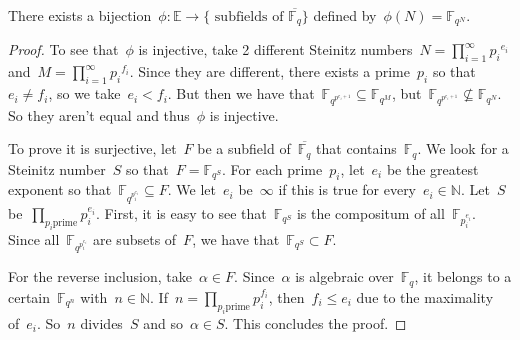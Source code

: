 \begin{theorem}
  There exists a bijection~$\phi\colon \mathbb{E} \rightarrow \{\text{ subfields of } \overline{\mathbb{F}_q} \}$ defined by~$\phi(N) = \mathbb{F}_{q^N}$.
  \begin{proof}
    To see that~$\phi$ is injective, take 2 different Steinitz numbers~$N=\prod_{i=1}^\infty {p_i}^{e_{i}}$ and~$M=\prod_{i=1}^\infty {p_i}^{f_{i}}$. Since they are different, there exists a prime~$p_i$ so that~$e_i \neq f_i$, so we take~$e_i < f_i$. But then we have that~$\mathbb{F}_{q^{p^{e_i+1}}} \subseteq \mathbb{F}_{q^M}$, but~$\mathbb{F}_{q^{p^{e_i+1}}} \nsubseteq \mathbb{F}_{q^N}$. So they aren't equal and thus~$\phi$ is injective.

    To prove it is surjective, let~$F$ be a subfield of~$\overline{\mathbb{F}_{q}}$ that contains~$\mathbb{F}_q$. We look for a Steinitz number~$S$ so that~$F = \mathbb{F}_{q^S}$. For each prime~$p_i$, let~$e_i$ be the greatest exponent so that~$\mathbb{F}_{q^{p_i^{e_i}}} \subseteq F$. We let~$e_i$ be~$\infty$ if this is true for every~$e_i \in \mathbb{N}$. Let~$S$ be~$\prod_{p_i \text{prime}} p_i^{e_i}$. First, it is easy to see that~$\mathbb{F}_{q^S}$ is the compositum of all~$\mathbb{F}_{p_i^{e_i}}$. Since all~$\mathbb{F}_{q^{p_i^{e_i}}}$ are subsets of~$F$, we have that~$\mathbb{F}_{q^S} \subset F$.
    
    For the reverse inclusion, take~$\alpha \in F$. Since~$\alpha$ is algebraic over~$\mathbb{F}_q$, it belongs to a certain~$\mathbb{F}_{q^n}$ with~$n \in \mathbb{N}$. If~$n = \prod_{p_i \text{prime}} p_i^{f_i}$, then~$f_i \leq e_i$ due to the maximality of~$e_i$. So~$n$ divides~$S$ and so~$\alpha \in S$. This concludes the proof.
  \end{proof}
\end{theorem}


